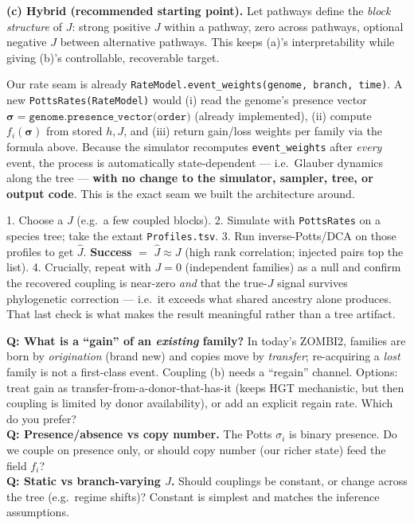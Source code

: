 \documentclass[11pt, oneside]{article}
\newcommand{\sig}{\boldsymbol{\sigma}}
\begin{document}
\textbf{(c) Hybrid (recommended starting point).} Let pathways define the \emph{block
structure} of $J$: strong positive $J$ within a pathway, zero across pathways, optional
negative $J$ between alternative pathways. This keeps (a)'s interpretability while giving
(b)'s controllable, recoverable target.

\begin{conceptbox}
Our rate seam is already \texttt{RateModel.event\_weights(genome, branch, time)}. A new
\texttt{PottsRates(RateModel)} would (i) read the genome's presence vector
$\sig=\texttt{genome.presence\_vector(order)}$ (already implemented), (ii) compute $f_i(\sig)$
from stored $h,J$, and (iii) return gain/loss weights per family via the formula above. Because
the simulator recomputes \texttt{event\_weights} after \emph{every} event, the process is
automatically state-dependent --- i.e.\ Glauber dynamics along the tree --- \textbf{with no
change to the simulator, sampler, tree, or output code}. This is the exact seam we built the
architecture around.
\end{conceptbox}

\begin{intuitionbox}
1. Choose a $J$ (e.g.\ a few coupled blocks). 2. Simulate with \texttt{PottsRates} on a species
tree; take the extant \texttt{Profiles.tsv}. 3. Run inverse-Potts/DCA on those profiles to get
$\hat J$. \textbf{Success} $=$ $\hat J \approx J$ (high rank correlation; injected pairs top the
list). 4. Crucially, repeat with $J=0$ (independent families) as a null and confirm the
recovered coupling is near-zero \emph{and} that the true-$J$ signal survives phylogenetic
correction --- i.e.\ it exceeds what shared ancestry alone produces. That last check is what
makes the result meaningful rather than a tree artifact.
\end{intuitionbox}

\begin{faqbox}
\textbf{Q: What is a ``gain'' of an \emph{existing} family?} In today's ZOMBI2, families are
born by \emph{origination} (brand new) and copies move by \emph{transfer}; re-acquiring a
\emph{lost} family is not a first-class event. Coupling (b) needs a ``regain'' channel. Options:
treat gain as transfer-from-a-donor-that-has-it (keeps HGT mechanistic, but then coupling is
limited by donor availability), or add an explicit regain rate. Which do you prefer?\\[2pt]
\textbf{Q: Presence/absence vs copy number.} The Potts $\sigma_i$ is binary presence. Do we
couple on presence only, or should copy number (our richer state) feed the field $f_i$?\\[2pt]
\textbf{Q: Static vs branch-varying $J$.} Should couplings be constant, or change across the
tree (e.g.\ regime shifts)? Constant is simplest and matches the inference assumptions.
\end{faqbox}
\end{document}

